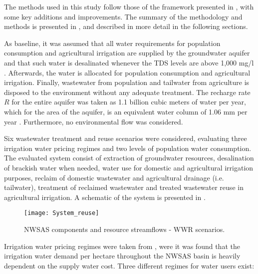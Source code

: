 The methods used in this study follow those of the framework presented in \cite{ramirezgomezTechnoeconomicGISbasedModel2018}, with some key additions and improvements. The summary of the methodology and methods is presented in , and described in more detail in the following sections.



As baseline, it was assumed that all water requirements for population consumption and agricultural irrigation are supplied by the groundwater aquifer and that such water is desalinated whenever the TDS levels are above 1,000 mg/l \cite{fao1985water}. Afterwards, the water is allocated for population consumption and agricultural irrigation. Finally, wastewater from population and tailwater from agriculture is disposed to the environment without any adequate treatment. The recharge rate $R$ for the entire aquifer was taken as 1.1 billion cubic meters of water per year, which for the area of the aquifer, is an equivalent water column of 1.06 mm per year \cite{BetterValorizationIrrigation2015}. Furthermore, no environmental flow was considered.

Six wastewater treatment and reuse scenarios were considered, evaluating three irrigation water pricing regimes and two levels of population water consumption. The evaluated system consist of extraction of groundwater resources, desalination of brackish water when needed, water use for domestic and agricultural irrigation purposes, reclaim of domestic wastewater and agricultural drainage (i.e. tailwater), treatment of reclaimed wastewater and treated wastewater reuse in agricultural irrigation. A schematic of the system is presented in .

\begin{figure*}[!ht]
	\centering
	\texttt{[image: System\_reuse]}
	\caption{NWSAS components and resource streamflows - WWR scenarios.}
	\label{fig:system_reuse}
\end{figure*}

Irrigation water pricing regimes were taken from \cite{Socioeconomicaspectsirrigation2014}, were it was found that the irrigation water demand per hectare throughout the NWSAS basin is heavily dependent on the supply water cost. Three different regimes for water users exist: 

